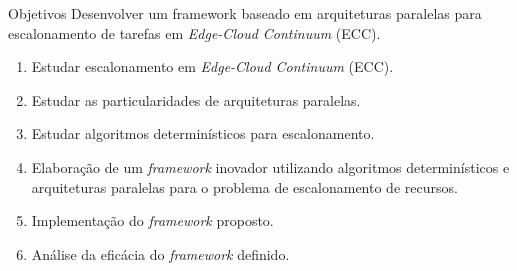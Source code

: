 \begin{frame}{Objetivos}
    Desenvolver um framework baseado em arquiteturas paralelas para
    escalonamento de tarefas em \textit{Edge-Cloud Continuum} (ECC).
    \vspace{10px}
    \begin{enumerate}
        \item Estudar escalonamento em \textit{Edge-Cloud Continuum} (ECC).
        \item Estudar as particularidades de arquiteturas paralelas.
        \item Estudar algoritmos determinísticos para escalonamento.
        \item Elaboração de um \textit{framework} inovador utilizando algoritmos determinísticos e arquiteturas paralelas para o problema de escalonamento de recursos.
        \item Implementação do \textit{framework} proposto.
        \item Análise da eficácia do \textit{framework} definido.
    \end{enumerate}
\end{frame}
